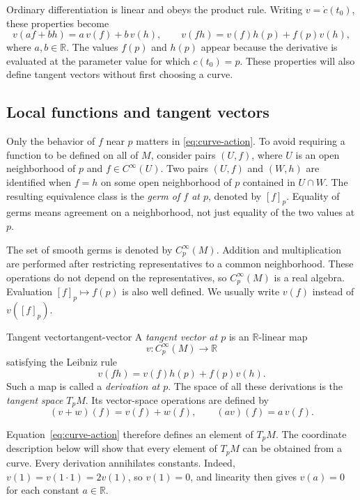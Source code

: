 \documentclass[11pt,a4paper]{article}
\numberwithin{equation}{section}
\newcommand{\R}{\mathbb R}
\newcommand{\Cinf}{C^\infty}
\begin{document}
Ordinary differentiation is linear and obeys the product rule. Writing
\(v=\dot c(t_0)\), these properties become
\[
 v(af+bh)=a\,v(f)+b\,v(h),\qquad
 v(fh)=v(f)h(p)+f(p)v(h),
\]
where \(a,b\in\R\). The values \(f(p)\) and \(h(p)\) appear because the
derivative is evaluated at the parameter value for which \(c(t_0)=p\).
These properties will also define tangent vectors without first choosing a
curve.

\subsection{Local functions and tangent vectors}

Only the behavior of \(f\) near \(p\) matters in
\eqref{eq:curve-action}. To avoid requiring a function to be defined on all
of \(M\), consider pairs \((U,f)\), where \(U\) is an open neighborhood of
\(p\) and \(f\in\Cinf(U)\). Two pairs \((U,f)\) and \((W,h)\) are
identified when \(f=h\) on some open neighborhood of \(p\) contained in
\(U\cap W\). The resulting equivalence class is the \emph{germ of \(f\)
at \(p\)}, denoted by \([f]_p\). Equality of germs means agreement on a
neighborhood, not just equality of the two values at \(p\).

The set of smooth germs is denoted by \(\Cinf_p(M)\). Addition and
multiplication are performed after restricting representatives to a common
neighborhood. These operations do not depend on the representatives, so
\(\Cinf_p(M)\) is a real algebra. Evaluation \([f]_p\mapsto f(p)\) is
also well defined. We usually write \(v(f)\) instead of \(v([f]_p)\).

\begin{definition}{Tangent vector}{tangent-vector}
A \emph{tangent vector at \(p\)} is an \(\R\)-linear map
\[
 v:\Cinf_p(M)\longrightarrow\R
\]
satisfying the Leibniz rule
\[
 v(fh)=v(f)h(p)+f(p)v(h).
\]
Such a map is called a \emph{derivation at \(p\)}. The space of all
these derivations is the \emph{tangent space} \(T_pM\). Its vector-space
operations are defined by
\[
 (v+w)(f)=v(f)+w(f),\qquad (av)(f)=a\,v(f).
\]
\end{definition}

Equation~\eqref{eq:curve-action} therefore defines an element of \(T_pM\).
The coordinate description below will show that every element of \(T_pM\)
can be obtained from a curve. Every derivation annihilates constants.
Indeed, \(v(1)=v(1\cdot1)=2v(1)\), so \(v(1)=0\), and linearity then
gives \(v(a)=0\) for each constant \(a\in\R\).
\end{document}
